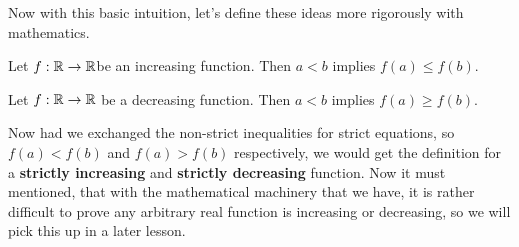Now with this basic intuition, let's define these ideas more rigorously with mathematics.

\begin{define}
Let $f:\mathbb{R}\to\mathbb{R}$\footnotemark be an increasing function. Then $a<b$ implies $f(a)\le f(b)$.
\label{def:inc}
\end{define}
\begin{define}
Let $f:\mathbb{R}\to\mathbb{R}$ be a decreasing function. Then $a<b$ implies $f(a)\ge f(b)$.
\end{define}

Now had we exchanged the non-strict inequalities for strict equations, so $f(a)<f(b)$ and $f(a)>f(b)$ respectively, we would get the definition for a \textbf{strictly increasing} and \textbf{strictly decreasing} function. Now it must mentioned, that with the mathematical machinery that we have, it is rather difficult to prove any arbitrary real function is increasing or decreasing, so we will pick this up in a later lesson.

